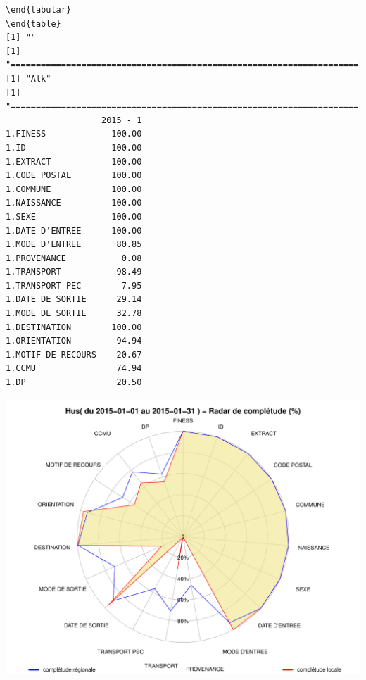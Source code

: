 \documentclass[]{article}
\begin{document}
\begin{verbatim}
\end{tabular} 
\end{table} 
[1] ""
[1] "====================================================================="
[1] "Alk"
[1] "====================================================================="
                   2015 - 1
1.FINESS             100.00
1.ID                 100.00
1.EXTRACT            100.00
1.CODE POSTAL        100.00
1.COMMUNE            100.00
1.NAISSANCE          100.00
1.SEXE               100.00
1.DATE D'ENTREE      100.00
1.MODE D'ENTREE       80.85
1.PROVENANCE           0.08
1.TRANSPORT           98.49
1.TRANSPORT PEC        7.95
1.DATE DE SORTIE      29.14
1.MODE DE SORTIE      32.78
1.DESTINATION        100.00
1.ORIENTATION         94.94
1.MOTIF DE RECOURS    20.67
1.CCMU                74.94
1.DP                  20.50
\end{verbatim}

\includegraphics{completude_files/figure-latex/finess-9.pdf}
\end{document}
